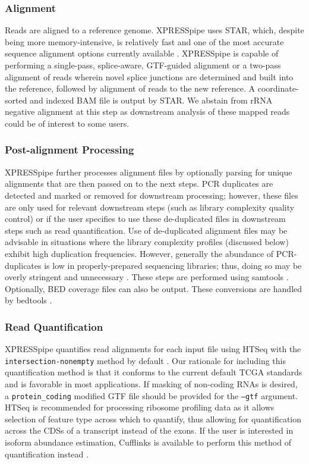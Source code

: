 \documentclass[10pt, oneside]{article}
\begin{document}
\subsubsection{Alignment}
Reads are aligned to a reference genome. XPRESSpipe uses STAR, which, despite being more memory-intensive, is relatively fast and one of the most accurate sequence alignment options currently available \cite{star, baruzzo_natmeth}. XPRESSpipe is capable of performing a single-pass, splice-aware, GTF-guided alignment or a two-pass alignment of reads wherein novel splice junctions are determined and built into the reference, followed by alignment of reads to the new reference. A coordinate-sorted and indexed BAM file is output by STAR. We abstain from rRNA negative alignment at this step as downstream analysis of these mapped reads could be of interest to some users.

\subsubsection{Post-alignment Processing}
XPRESSpipe further processes alignment files by optionally parsing for unique alignments that are then passed on to the next steps. PCR duplicates are detected and marked or removed for downstream processing; however, these files are only used for relevant downstream steps (such as library complexity quality control) or if the user specifies to use these de-duplicated files in downstream steps such as read quantification. Use of de-duplicated alignment files may be advisable in situations where the library complexity profiles (discussed below) exhibit high duplication frequencies. However, generally the abundance of PCR-duplicates is low in properly-prepared sequencing libraries; thus, doing so may be overly stringent and unnecessary \cite{umi}. These steps are performed using samtools \cite{samtools}. Optionally, BED coverage files can also be output. These conversions are handled by bedtools \cite{bedtools}.

\subsubsection{Read Quantification}
XPRESSpipe quantifies read alignments for each input file using HTSeq with the \texttt{intersection-nonempty} method by default \cite{htseq, count_benchmark}. Our rationale for including this quantification method is that it conforms to the current default TCGA standards and is favorable in most applications. If masking of non-coding RNAs is desired, a \texttt{protein\_coding} modified GTF file should be provided for the \texttt{--gtf} argument. HTSeq is recommended for processing ribosome profiling data as it allows selection of feature type across which to quantify, thus allowing for quantification across the CDSs of a transcript instead of the exons. If the user is interested in isoform abundance estimation, Cufflinks is available to perform this method of quantification instead \cite{cufflinks, count_benchmark}.
\end{document}
